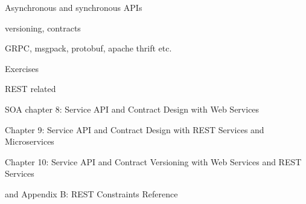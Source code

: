 \documentclass[Screen16to9,17pt]{foils}
\begin{document}

\begin{list2}
\item Asynchronous and synchronous APIs
\item versioning, contracts
\item GRPC, msgpack, protobuf, apache thrift etc.
\end{list2}

Exercises
\begin{list2}
\item REST related
\item
\end{list2}




\begin{list1}
\item SOA chapter 8: Service API and Contract Design
with Web Services
\item Chapter 9: Service API and Contract Design with
REST Services and Microservices
\item Chapter 10: Service API and Contract Versioning
with Web Services and REST Services
\item and Appendix B: REST Constraints Reference
\end{list1}















\slidenext
\end{document}
